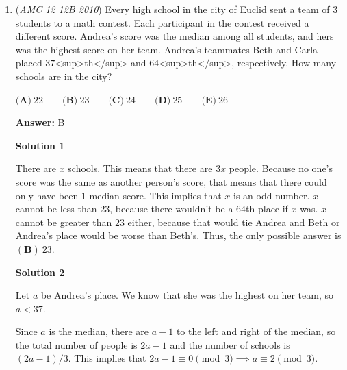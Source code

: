 \begin{enumerate}
\textbf{Solution 2}

Let $x$ be the time she drove in the rain. Thus, the number of minutes she did not drive in the rain is $40-x$ . 

 Since we are calculating the time in minutes, it is best to convert the speeds in minutes. Thus, the speed per minute when it is not raining is $\frac{1}{2}$ miles per minute, and $\frac{1}{3}$ miles per minute when it is raining. Thus, we have the equation, $\frac{1}{2} \cdot (40-x) + \frac{1}{3} \cdot x = 16$ 

 Solving, gives $x$ = $24$ , so the amount of time she drove in the rain is $24$ minutes.

 


	\item (\textit{AMC 12 12B 2010}) Every high school in the city of Euclid sent a team of $3$ students to a math contest. Each participant in the contest received a different score. Andrea's score was the median among all students, and hers was the highest score on her team. Andrea's teammates Beth and Carla placed $37$<sup>th</sup> and $64$<sup>th</sup>, respectively. How many schools are in the city?


 $\textbf{(A)}\ 22 \qquad \textbf{(B)}\ 23 \qquad \textbf{(C)}\ 24 \qquad \textbf{(D)}\ 25 \qquad \textbf{(E)}\ 26$

 \textbf{Answer: }B



\textbf{Solution 1}

There are $x$ schools. This means that there are $3x$ people. Because no one's score was the same as another person's score, that means that there could only have been $1$ median score. This implies that $x$ is an odd number. $x$ cannot be less than $23$, because there wouldn't be a $64$th place if $x$ was. $x$ cannot be greater than $23$ either, because that would tie Andrea and Beth or Andrea's place would be worse than Beth's. Thus, the only possible answer is $\boxed{\mathbf{(B)}\ 23}$.

 



\textbf{Solution 2}

Let $a$ be Andrea's place. We know that she was the highest on her team, so $a < 37$. 

 Since $a$ is the median, there are $a-1$ to the left and right of the median, so the total number of people is $2a-1$ and the number of schools is $(2a-1)/3$. This implies that $2a-1 \equiv 0 \pmod{3} \implies a \equiv 2 \pmod{3}$. 


\end{enumerate}
